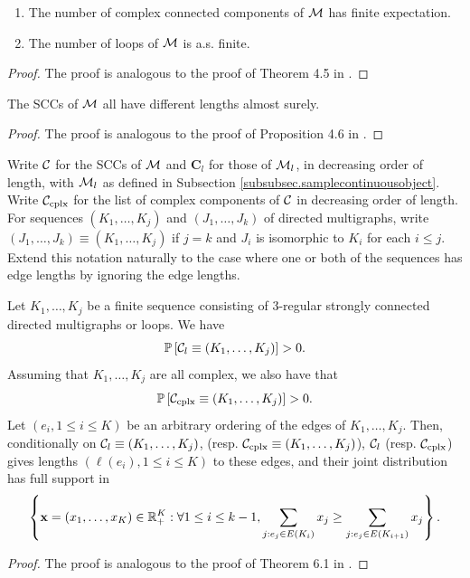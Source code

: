 \begin{corollary}
\begin{enumerate}
    \item The number of complex connected components of ${\mathcal M}$ has finite expectation.
    \item The number of loops of ${\mathcal M}$ is a.s. finite.
\end{enumerate}
\end{corollary}
\begin{proof}
The proof is analogous to the proof of Theorem 4.5 in \cite{goldschmidtScalingLimitCritical2019}.
\end{proof}
\begin{corollary}\label{cor.allengthsaredifferent}
The SCCs of ${\mathcal M}$ all have different lengths almost surely.
\end{corollary}
\begin{proof}
The proof is analogous to the proof of Proposition 4.6 in \cite{goldschmidtScalingLimitCritical2019}.
\end{proof}
Write ${\mathcal C}$ for the SCCs of ${\mathcal M}$ and $\mathbf{C}_l$ for those of ${\mathcal M}_l$, in decreasing order of length, with ${\mathcal M}_l$ as defined in Subsection  \ref{subsubsec.samplecontinuousobject}. Write ${\mathcal C}_{\text{cplx}}$ for the list of complex components of ${\mathcal C}$ in decreasing order of length. For sequences $(K_1,\dots, K_j)$ and $(J_1,\dots,J_k)$ of directed multigraphs, write $(J_1,\dots,J_k)\equiv(K_1,\dots, K_j)$ if $j=k$ and $J_i$ is isomorphic to $K_i$ for each $i\leq j$. Extend this notation naturally to the case where one or both of the sequences has edge lengths by ignoring the edge lengths. 
\begin{corollary}
Let $K_1,\dots, K_j$ be a finite sequence consisting of $3$-regular strongly connected directed multigraphs or loops. We have 
$${\mathbb P}\left[{\mathcal C}_l\equiv(K_1,\dots, K_j)\right]>0.$$
Assuming that $K_1,\dots, K_j$ are all complex, we also have that 
$${\mathbb P}\left[ {\mathcal C}_{\text{cplx}}\equiv(K_1,\dots, K_j)\right]>0.$$
Let $(e_i,1\leq i \leq K)$ be an arbitrary ordering of the edges of $K_1,\dots, K_j$. Then, conditionally on ${\mathcal C}_l\equiv(K_1,\dots, K_j)$, (resp. ${\mathcal C}_{\text{cplx}}\equiv(K_1,\dots, K_j)$), ${\mathcal C}_l$ (resp. ${\mathcal C}_{\text{cplx}}$) gives lengths $(\ell(e_i),1\leq i \leq K)$ to these edges, and their joint distribution has full support in 
$$\left\{\mathbf{x}=(x_1,\dots, x_K)\in {\mathbb R}_+^K:\forall 1\leq i\leq k-1, \sum_{j:e_j\in E(K_i)}x_j \geq \sum_{j:e_j\in E(K_{i+1})}x_j\right\}.$$
\end{corollary}
\begin{proof}
The proof is analogous to the proof of Theorem 6.1 in \cite{goldschmidtScalingLimitCritical2019}.
\end{proof}

